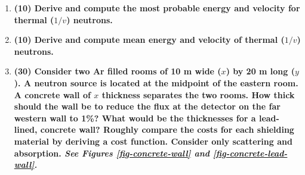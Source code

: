 \documentclass[11pt,a4paper]{article}
\begin{document}
\begin{enumerate}[leftmargin=*,topsep=0pt,font=\bfseries]
        
        
        
        
        
        
        
        
        
        
        
        
        
        \newpage
    \item\textbf{(10) Derive and compute the most probable energy and velocity for thermal ($1/v$) neutrons.}
        \vspace{0.25in}\\
        
        
        
        
        
        
        
        
        
        
        
        
        
        
        \newpage
    \item\textbf{(10) Derive and compute mean energy and velocity of thermal ($1/v$) neutrons.}
        \vspace{0.25in}\\
        
        
        
        
        
        
        
        
        
        
        
        
        \newpage
    \item\textbf{(30) Consider two Ar filled rooms of 10 m wide ($x$) by 20 m long ($y$). A neutron source is located at the midpoint of the eastern room. A concrete wall of $x$ thickness separates the two rooms. How thick should the wall be to reduce the flux at the detector on the far western wall to 1\%? What would be the thicknesses for a lead-lined, concrete wall? Roughly compare the costs for each shielding material by deriving a cost function. Consider only scattering and absorption. \textit{See Figures \ref{fig-concrete-wall} and \ref{fig-concrete-lead-wall}.}}
        \vspace{0.25in}\\
\end{enumerate}

\newpage
\end{document}
